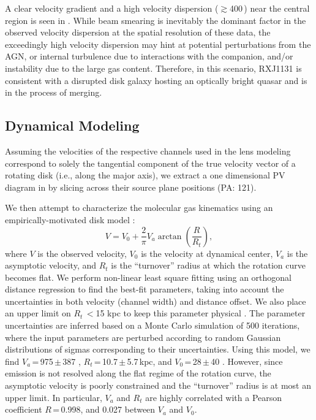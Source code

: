 \documentclass[]{emulateapj}
\begin{document}
A clear velocity gradient and a high
velocity dispersion ($\gtrsim$400\,\kms) near the central region
is seen in . While beam smearing is inevitably the
dominant factor in the observed velocity dispersion
at the spatial resolution of these data, the exceedingly
high velocity dispersion may hint
at potential perturbations from the AGN, or internal turbulence due to
interactions with the companion, and/or instability due to the large gas
content.
Therefore, in this scenario, RXJ1131 is
consistent with a disrupted disk galaxy hosting an optically
bright quasar and is in the process of merging.

\subsection{\bco Dynamical Modeling} \label{sec:dynamics} 
Assuming the velocities of the respective channels used in the
lens modeling correspond to solely the tangential component of the
true velocity vector of a rotating disk (i.e., along the major axis),
we extract a one dimensional PV diagram in 
by slicing across their source plane positions (PA: 121\degr).

We then attempt to characterize the molecular gas kinematics using an
empirically-motivated disk model \citep[\eg][]{Courteau97a,Puech08a,Miller11a}:
\begin{equation}
V = V_0 + \frac{2}{\pi} V_{a} \arctan(\frac{R}{R_{t}}),
\end{equation}
where $V$ is the observed velocity, $V_0$ is the velocity at dynamical center,
$V_{a}$ is the asymptotic velocity, and $R_{t}$ is the ``turnover''
radius at which the rotation curve becomes flat.
We perform non-linear least square fitting using an orthogonal distance
regression to find the best-fit parameters,
taking into account the uncertainties in both velocity (channel width) and
distance offset. We also place an upper limit on $R_{t}$\,$<$15 kpc
to keep this parameter physical \citep[\eg][]{Puech08a,Miller11a}.
The parameter uncertainties are inferred based on a Monte Carlo simulation
of 500 iterations, where the input parameters are perturbed
according to random Gaussian distributions of sigmas
corresponding to their uncertainties.
Using this model, we find $V_{a}$\,=\,975\,$\pm$\,387 \kms,
$R_{t}$\,=\,10.7\,$\pm$\,5.7\,kpc, and $V_0$\,=\,28\,$\pm$\,40 \kms.
However, since emission is not resolved along the flat regime
of the rotation curve, the asymptotic velocity is poorly constrained and
the ``turnover'' radius is at most an upper limit.
In particular, $V_{a}$ and $R_{t}$ are highly correlated with a
Pearson coefficient $R$\,=\,0.998, and 0.027 between $V_{a}$ and $V_0$.
\end{document}
